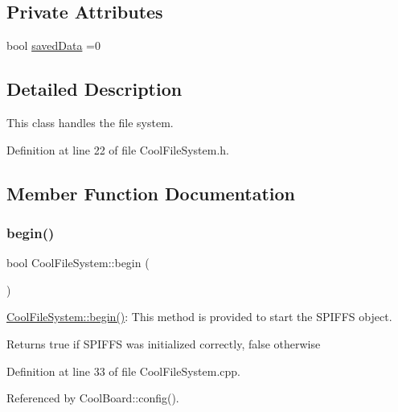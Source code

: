 \subsection*{Private Attributes}
\begin{DoxyCompactItemize}
\item 
bool \hyperlink{classCoolFileSystem_ad398e0c5c41a0c88acdf5d672aa71351}{saved\+Data} =0
\end{DoxyCompactItemize}


\subsection{Detailed Description}
This class handles the file system. 

Definition at line 22 of file Cool\+File\+System.\+h.



\subsection{Member Function Documentation}
\mbox{\label{classCoolFileSystem_a6ba6f666ed4c530174f8569d2c636748}} 
\subsubsection{\texorpdfstring{begin()}{begin()}}
{\footnotesize\ttfamily bool Cool\+File\+System\+::begin (\begin{DoxyParamCaption}{ }\end{DoxyParamCaption})}

\hyperlink{classCoolFileSystem_a6ba6f666ed4c530174f8569d2c636748}{Cool\+File\+System\+::begin()}\+: This method is provided to start the S\+P\+I\+F\+FS object.

\begin{DoxyReturn}{Returns}
true if S\+P\+I\+F\+FS was initialized correctly, false otherwise 
\end{DoxyReturn}


Definition at line 33 of file Cool\+File\+System.\+cpp.



Referenced by Cool\+Board\+::config().



